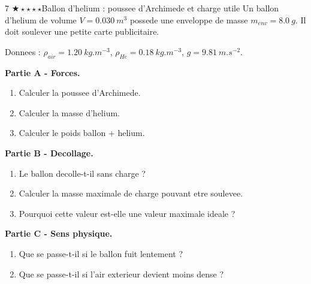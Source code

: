 \documentclass[11pt,a4paper]{article}
\newcommand{\diffone}{\(\bigstar\star\star\star\star\)}
\begin{document}
\begin{probleme}{7 \diffone}{Ballon d'helium : poussee d'Archimede et charge utile}
Un ballon d'helium de volume \(V=\SI{0.030}{m^3}\) possede une enveloppe de masse \(m_{env}=\SI{8.0}{g}\). Il doit soulever une petite carte publicitaire.

Donnees : \(\rho_{air}=\SI{1.20}{kg.m^{-3}}\), \(\rho_{He}=\SI{0.18}{kg.m^{-3}}\), \(g=\SI{9.81}{m.s^{-2}}\).

\textbf{Partie A - Forces.}
\begin{enumerate}
\item Calculer la poussee d'Archimede.
\item Calculer la masse d'helium.
\item Calculer le poids ballon + helium.
\end{enumerate}

\textbf{Partie B - Decollage.}
\begin{enumerate}[resume]
\item Le ballon decolle-t-il sans charge ?
\item Calculer la masse maximale de charge pouvant etre soulevee.
\item Pourquoi cette valeur est-elle une valeur maximale ideale ?
\end{enumerate}

\textbf{Partie C - Sens physique.}
\begin{enumerate}[resume]
\item Que se passe-t-il si le ballon fuit lentement ?
\item Que se passe-t-il si l'air exterieur devient moins dense ?
\end{enumerate}
\end{probleme}
\end{document}
